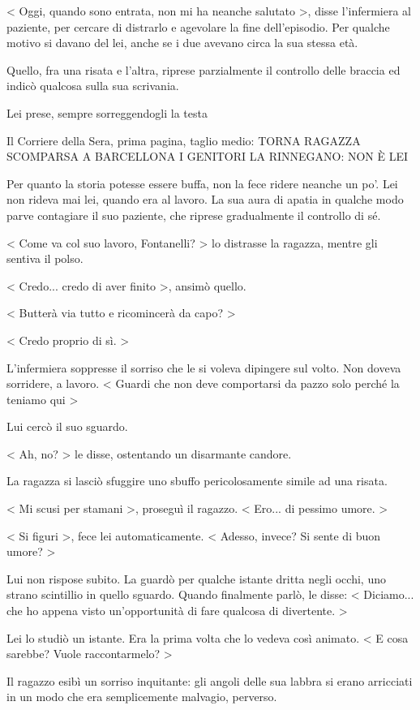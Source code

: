 < Oggi, quando sono entrata, non mi ha neanche salutato >, disse l'infermiera al paziente, per cercare di distrarlo e agevolare la fine dell'episodio. Per qualche motivo si davano del lei, anche se i due avevano circa la sua stessa età.

Quello, fra una risata e l'altra, riprese parzialmente il controllo delle braccia ed indicò qualcosa sulla sua scrivania.

Lei prese, sempre sorreggendogli la testa

Il Corriere della Sera, prima pagina, taglio medio:
TORNA RAGAZZA SCOMPARSA A BARCELLONA
I GENITORI LA RINNEGANO: NON È LEI

Per quanto la storia potesse essere buffa, non la fece ridere neanche un po'. Lei non rideva mai lei, quando era al lavoro. La sua aura di apatia in qualche modo parve contagiare il suo paziente, che riprese gradualmente il controllo di sé.

< Come va col suo lavoro, Fontanelli? > lo distrasse la ragazza, mentre gli sentiva il polso.

< Credo... credo di aver finito >, ansimò quello.

< Butterà via tutto e ricomincerà da capo? >

< Credo proprio di sì. >

L'infermiera soppresse il sorriso che le si voleva dipingere sul volto. Non doveva sorridere, a lavoro. < Guardi che non deve comportarsi da pazzo solo perché la teniamo qui >

Lui cercò il suo sguardo.

< Ah, no? > le disse, ostentando un disarmante candore.

La ragazza si lasciò sfuggire uno sbuffo pericolosamente simile ad una risata.

< Mi scusi per stamani >, proseguì il ragazzo. < Ero... di pessimo umore. >

< Si figuri >, fece lei automaticamente. < Adesso, invece? Si sente di buon umore? >

Lui non rispose subito. La guardò per qualche istante dritta negli occhi, uno strano scintillio in quello sguardo. Quando finalmente parlò, le disse: < Diciamo... che ho appena visto un'opportunità di fare qualcosa di divertente. >

Lei lo studiò un istante. Era la prima volta che lo vedeva così animato. < E cosa sarebbe? Vuole raccontarmelo? >

Il ragazzo esibì un sorriso inquitante: gli angoli delle sua labbra si erano arricciati in un modo che era semplicemente malvagio, perverso.

